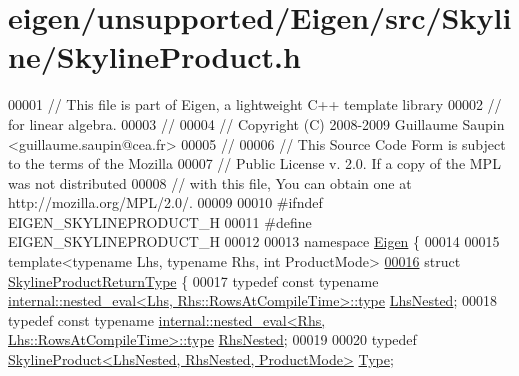 \hypertarget{eigen_2unsupported_2_eigen_2src_2_skyline_2_skyline_product_8h_source}{}\section{eigen/unsupported/\+Eigen/src/\+Skyline/\+Skyline\+Product.h}
\label{eigen_2unsupported_2_eigen_2src_2_skyline_2_skyline_product_8h_source}

\begin{DoxyCode}
00001 \textcolor{comment}{// This file is part of Eigen, a lightweight C++ template library}
00002 \textcolor{comment}{// for linear algebra.}
00003 \textcolor{comment}{//}
00004 \textcolor{comment}{// Copyright (C) 2008-2009 Guillaume Saupin <guillaume.saupin@cea.fr>}
00005 \textcolor{comment}{//}
00006 \textcolor{comment}{// This Source Code Form is subject to the terms of the Mozilla}
00007 \textcolor{comment}{// Public License v. 2.0. If a copy of the MPL was not distributed}
00008 \textcolor{comment}{// with this file, You can obtain one at http://mozilla.org/MPL/2.0/.}
00009 
00010 \textcolor{preprocessor}{#ifndef EIGEN\_SKYLINEPRODUCT\_H}
00011 \textcolor{preprocessor}{#define EIGEN\_SKYLINEPRODUCT\_H}
00012 
00013 \textcolor{keyword}{namespace }\hyperlink{namespace_eigen}{Eigen} \{ 
00014 
00015 \textcolor{keyword}{template}<\textcolor{keyword}{typename} Lhs, \textcolor{keyword}{typename} Rhs, \textcolor{keywordtype}{int} ProductMode>
\hyperlink{struct_eigen_1_1_skyline_product_return_type}{00016} \textcolor{keyword}{struct }\hyperlink{struct_eigen_1_1_skyline_product_return_type}{SkylineProductReturnType} \{
00017     \textcolor{keyword}{typedef} \textcolor{keyword}{const} \textcolor{keyword}{typename} 
      \hyperlink{class_eigen_1_1internal_1_1_tensor_lazy_evaluator_writable}{internal::nested\_eval<Lhs, Rhs::RowsAtCompileTime>::type}
       \hyperlink{class_eigen_1_1internal_1_1_tensor_lazy_evaluator_writable}{LhsNested};
00018     \textcolor{keyword}{typedef} \textcolor{keyword}{const} \textcolor{keyword}{typename} 
      \hyperlink{class_eigen_1_1internal_1_1_tensor_lazy_evaluator_writable}{internal::nested\_eval<Rhs, Lhs::RowsAtCompileTime>::type}
       \hyperlink{class_eigen_1_1internal_1_1_tensor_lazy_evaluator_writable}{RhsNested};
00019 
00020     \textcolor{keyword}{typedef} \hyperlink{class_eigen_1_1_skyline_product}{SkylineProduct<LhsNested, RhsNested, ProductMode>}
       \hyperlink{class_eigen_1_1_skyline_product}{Type};

\end{DoxyCode}
